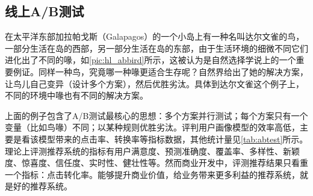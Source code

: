       \subsection{线上A/B测试}
      在太平洋东部加拉帕戈斯（Galapagos）的一个小岛上有一种名叫达尔文雀的鸟，一部分生活在岛的西部，另一部分生活在岛的东部，由于生活环境的细微不同它们进化出了不同的喙，如\autoref{pic:hl_abbird}所示，这被认为是自然选择学说上的一个重要例证。同样一种鸟，究竟哪一种喙更适合生存呢？自然界给出了她的解决方案，让鸟儿自己变异（设计多个方案），然后优胜劣汰。具体到达尔文雀这个例子上，不同的环境中喙也有不同的解决方案。
      \begin{figure}
      \centering
        \label{pic:hl_abbird}
      \end{figure}
      上面的例子包含了A/B测试最核心的思想：多个方案并行测试；每个方案只有一个变量（比如鸟喙）不同；以某种规则优胜劣汰。评判用户画像模型的效率高低，主要是看该模型带来的点击率、转换率等指标数据，其他统计量见\autoref{tab:abtest}所示。理论上评测推荐系统的指标有用户满意度、预测准确度、覆盖率、多样性、新颖度、惊喜度、信任度、实时性、健壮性等。然而商业开发中，评测推荐结果只看重一个指标：点击转化率。能够提升商业价值，给业务带来更多利益的推荐系统，就是好的推荐系统。
